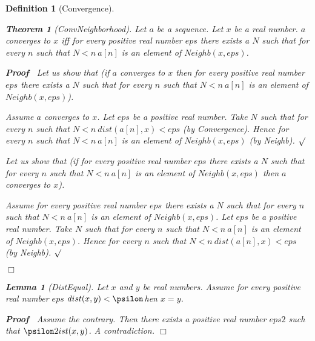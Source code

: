 \documentclass{article}
\newenvironment{forthel}{\begin{leftbar}}{\end{leftbar}}
\newenvironment{proof}{\noindent\textbf{Proof\ }}{\hspace*{\fill}$\Box$\medskip}
\newenvironment{subproof}{\begin{list}{}{}
		\item[\text{Proof}]}{\hfill $\surd$ \end{list}}
\newtheorem{lemma}{Lemma}
\newtheorem{theorem}{Theorem}
\newtheorem{definition}{Definition}
\begin{document}
\begin{forthel}
\begin{definition}[Convergence]
	\begin{theorem}[ConvNeighborhood]
	Let $a$ be a sequence. Let $x$ be a real number.
	$a$ converges to $x$ iff for every positive real number $eps$ there exists a $N$
	such that for every $n$ such that $N < n \ a[n]$ is an element of $Neighb(x,eps)$.
	\end{theorem}
	\begin{proof}
	Let us show that (if $a$ converges to $x$ then for every positive real number $eps$ there exists a $N$
	such that for every $n$ such that $N < n \ a[n]$ is an element of $Neighb(x,eps)$).
	\begin{subproof}
	Assume $a$ converges to $x$.
	Let $eps$ be a positive real number.
	Take $N$ such that for every $n$ such that $N < n \ dist(a[n],x) < eps$ (by Convergence).
	Hence for every $n$ such that $N < n \ a[n]$ is an element of $Neighb(x,eps)$ (by Neighb).
	\end{subproof}
	Let us show that (if for every positive real number $eps$ there exists a $N$ such that
	for every $n$ such that $N < n \ a[n]$ is an element of $Neighb(x,eps)$ then $a$ converges to $x$).
	\begin{subproof}
	Assume for every positive real number $eps$ there exists a $N$ such that
	for every $n$ such that $N < n \ a[n]$ is an element of $Neighb(x,eps)$.
	Let $eps$ be a positive real number.
	Take $N$ such that for every $n$ such that $N < n \ a[n]$ is an element of $Neighb(x,eps)$.
	Hence for every $n$ such that $N < n \ dist(a[n],x) < eps$ (by Neighb).
	\end{subproof}
	\end{proof}	
	
	\begin{lemma}[DistEqual]
	Let $x$ and $y$ be real numbers. Assume for every positive real number $eps$ $dist(x,y) < \psilon$hen $x = y$.
	\end{lemma}
	\begin{proof}
	Assume the contrary.
	Then there exists a positive real number $eps2$ such that $\psilon2ist(x,y)$.
	A contradiction.
	\end{proof}
	

\end{definition}
\end{forthel}
\end{document}
